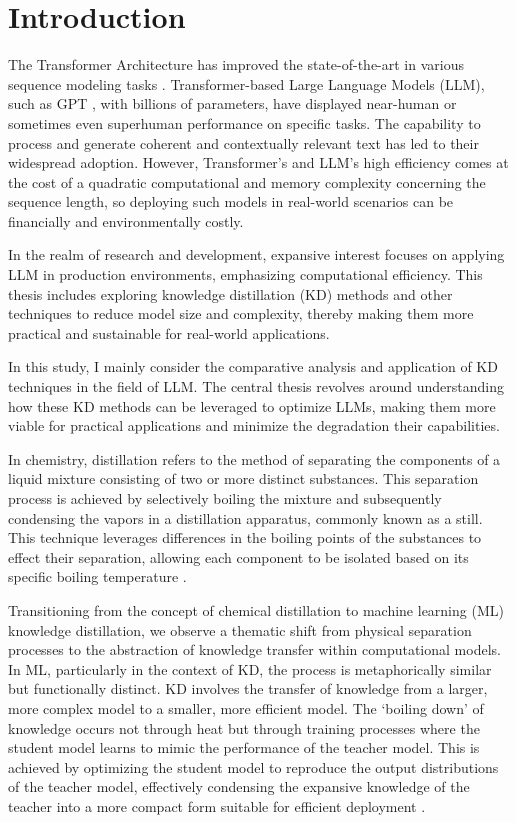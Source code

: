 \chapter{Introduction}
\label{chap:intro}

The Transformer Architecture has improved the state-of-the-art in various sequence modeling tasks \cite{attention}. Transformer-based Large Language Models (LLM), such as GPT \cite{gpt}, with billions of parameters, have displayed near-human or sometimes even superhuman performance on specific tasks. The capability to process and generate coherent and contextually relevant text has led to their widespread adoption. However, Transformer's and LLM's high efficiency comes at the cost of a quadratic computational and memory complexity concerning the sequence length, so deploying such models in real-world scenarios can be financially and environmentally costly.

In the realm of research and development, expansive interest focuses on applying LLM in production environments, emphasizing computational efficiency. This thesis includes exploring knowledge distillation (KD) methods and other techniques to reduce model size and complexity, thereby making them more practical and sustainable for real-world applications.

In this study, I mainly consider the comparative analysis and application of KD techniques in the field of LLM\@. The central thesis revolves around understanding how these KD methods can be leveraged to optimize LLMs, making them more viable for practical applications and minimize the degradation their capabilities.

In chemistry, distillation refers to the method of separating the components of a liquid mixture consisting of two or more distinct substances. This separation process is achieved by selectively boiling the mixture and subsequently condensing the vapors in a distillation apparatus, commonly known as a still. This technique leverages differences in the boiling points of the substances to effect their separation, allowing each component to be isolated based on its specific boiling temperature \cite{chem_distil}.

Transitioning from the concept of chemical distillation to machine learning (ML) knowledge distillation, we observe a thematic shift from physical separation processes to the abstraction of knowledge transfer within computational models. In ML, particularly in the context of KD, the process is metaphorically similar but functionally distinct. KD involves the transfer of knowledge from a larger, more complex model to a smaller, more efficient model. The `boiling down' of knowledge occurs not through heat but through training processes where the student model learns to mimic the performance of the teacher model. This is achieved by optimizing the student model to reproduce the output distributions of the teacher model, effectively condensing the expansive knowledge of the teacher into a more compact form suitable for efficient deployment \cite{distilling}.


